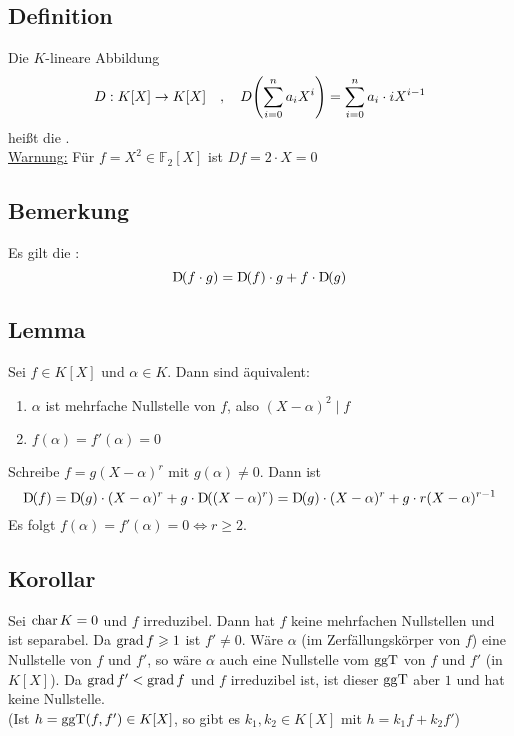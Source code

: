 \subsection[Definition: Formale Ableitung]{Definition} %
\label{sub:163}
Die $K$-lineare Abbildung 
\[
	D : K[X] \to K[X] \quad , \quad D \enbrace*{\sum_{i=0}^{n} a_i X^i} = \sum_{i=0}^{n} a_i \cdot i X^{i-1} 
\]
heißt die .\\
\uline{Warnung:} Für $f=X^2 \in \mathds{F}_2[X]$ ist $D f = 2 \cdot X =0$

\subsection[Bemerkung: Leibnizregel]{Bemerkung} %
\label{sub:164}
Es gilt die :
\[
	\mathrm{D}\mkern-1.5mu(f \cdot g) = \mathrm{D}\mkern-1.5mu (f)\cdot  g + f \cdot \mathrm{D}\mkern-1.5mu(g)
\]

\subsection[Lemma: Vielfachheit von Nullstellen bestimmen mittels der formalen Ableitung]{Lemma} %
\label{sub:165}
Sei $f \in K[X]$ und $\alpha \in K$. Dann sind äquivalent:
\begin{enumerate}[(1)]
	\item $\alpha$ ist mehrfache Nullstelle von $f$, also $(X-\alpha)^2 \mid f$
	\item $f(\alpha) = f'(\alpha)=0$
\end{enumerate}
Schreibe $f=g(X-\alpha)^r$ mit $g(\alpha)\not= 0$. Dann ist 
\[
	\mathrm{D}\mkern-1.5mu (f) = \mathrm{D}\mkern-1.5mu (g) \cdot (X-\alpha)^r + g \cdot \mathrm{D}\mkern-1.5mu((X-\alpha)^r) = \mathrm{D}\mkern-1.5mu (g) \cdot  (X-\alpha)^r + g \cdot r(X-\alpha)^{r-1}
\]
Es folgt $f(\alpha)= f'(\alpha)=0 \iff r\ge 2$. \bewende

\subsection[Korollar: Irreduzible Polynome sind separabel, wenn $\Char K=0$]{Korollar} %
\label{sub:166}
Sei $\Char K =0$ und $f$ irreduzibel. Dann hat $f$ keine mehrfachen Nullstellen und ist separabel.
Da $\operatorname{grad} f \geqslant 1$ ist $f' \not=0$. Wäre $\alpha$ (im Zerfällungskörper von $f$) eine Nullstelle von $f$ und $f'$, so wäre $\alpha$ auch eine Nullstelle vom $\operatorname{ggT}$ von
$f$ und $f'$ (in $K[X]$). Da $\operatorname{grad} f' < \operatorname{grad} f$ und $f$ irreduzibel ist, ist dieser $\operatorname{ggT}$ aber $1$ und hat keine Nullstelle. \bewende\\
(Ist $h= \operatorname{ggT} (f,f') \in K[X]$, so gibt es $k_1, k_2 \in K[X]$ mit $h=k_1 f+ k_2 f'$)

